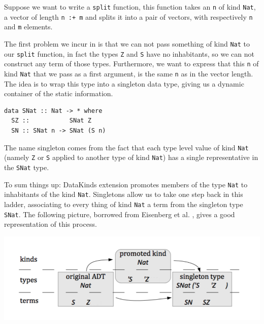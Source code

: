 \documentclass[11pt, titlepage]{article}
\begin{document}
Suppose we want to write a \texttt{split} function, this function takes
an \texttt{n} of kind \texttt{Nat}, a vector of length \texttt{n :+ m}
and splits it into a pair of vectors, with respectively \texttt{n} and
\texttt{m} elements.

The first problem we incur in is that we can not pass something of kind
\texttt{Nat} to our \texttt{split} function, in fact the types \texttt{Z} and \texttt{S} have no inhabitants, so we can not construct any term of those types. Furthermore, we want to
express that this \texttt{n} of kind \texttt{Nat} that we pass as a
first argument, is the same \texttt{n} as in the vector length. The idea is to 
wrap this type into a singleton data type, giving us a dynamic container of the static 
information.

\begin{verbatim}
data SNat :: Nat -> * where
  SZ ::           SNat Z
  SN :: SNat n -> SNat (S n)
\end{verbatim}

The name singleton comes from the fact that each type level value of
kind \texttt{Nat} (namely \texttt{Z} or \texttt{S} applied to another
type of kind \texttt{Nat}) has a single representative in the
\texttt{SNat} type.

To sum things up:
DataKinds extension promotes members of the type \texttt{Nat} to inhabitants of the kind \texttt{Nat}. Singletons allow us to take one step back in this ladder, associating to every thing of kind \texttt{Nat} a term from
the singleton type \texttt{SNat}. The following picture, borrowed from Eisenberg et al. \cite{singletons}, gives a good representation of this process.

\includegraphics[width=\textwidth]{singleton.png}\label{singletonImg}
\end{document}
